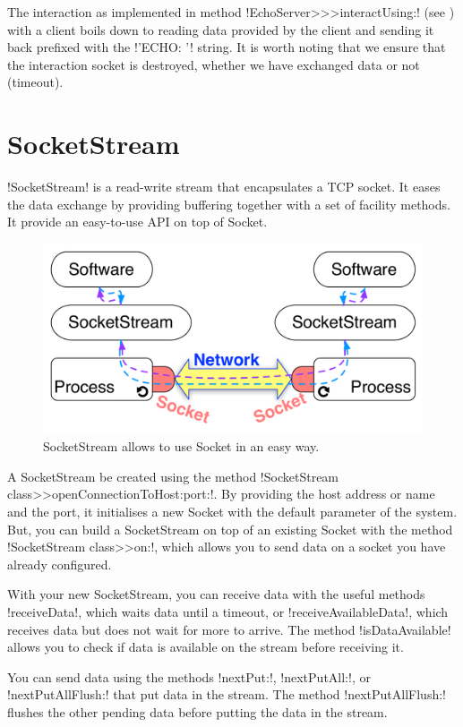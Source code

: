 \documentclass[a4paper,10pt,twoside]{book}
\begin{document}
The interaction as implemented in method \ct!EchoServer>>>interactUsing:! (see ) with a client boils down to reading data provided by the client and sending it back prefixed with the \ct!'ECHO: '! string.
It is worth noting that we ensure that the interaction socket is destroyed, whether we have exchanged data or not (timeout).

\section{SocketStream} 
\label{sec:socketStream}
\ct!SocketStream! is a read-write stream that encapsulates a TCP socket.
It eases the data exchange by providing buffering together with a set of facility methods. It provide an easy-to-use API on top of Socket. 


\begin{figure}[ht]\centering
	\includegraphics[width=.75\linewidth]{socketStream}
	\caption{SocketStream allows to use Socket in an easy way.}
	\label{fig:socketStream}
\end{figure}

A SocketStream be created using the method \ct!SocketStream class>>openConnectionToHost:port:!. By providing the host address or name and the port, it initialises a new Socket with the default parameter of the system.
But, you can build a SocketStream on top of an existing Socket with the method \ct!SocketStream class>>on:!, which allows you to send data on a socket you have already configured. 

With your new SocketStream, you can receive data with the useful methods \ct!receiveData!, which waits data until a timeout, or \ct!receiveAvailableData!, which receives data but does not wait for more to arrive. The method \ct!isDataAvailable! allows you to check if data is available on the stream before receiving it.

You can send data using the methods \ct!nextPut:!, \ct!nextPutAll:!, or \ct!nextPutAllFlush:! that put data in the stream. The method \ct!nextPutAllFlush:! flushes the other pending data before putting the data in the stream.
\end{document}
